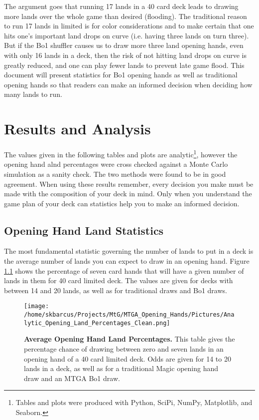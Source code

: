 \documentclass[oneside]{book}   %
\begin{document}
The argument goes that running 17 lands in a 40 card deck leads to drawing more lands over the whole game than desired (flooding). The traditional reason to run 17 lands in limited is for color considerations and to make certain that one hits one's important land drops on curve (i.e. having three lands on turn three). But if the Bo1 shuffler causes us to draw more three land opening hands, even with only 16 lands in a deck, then the risk of not hitting land drops on curve is greatly reduced, and one can play fewer lands to prevent late game flood. This document will present statistics for Bo1 opening hands as well as traditional opening hands so that readers can make an informed decision when deciding how many lands to run.

\chapter{Results and Analysis}
\label{results}

The values given in the following tables and plots are analytic\footnote{Tables and plots were produced with Python, SciPi, NumPy, Matplotlib, and Seaborn.}, however the opening hand alnd percentages were cross checked against a Monte Carlo simulation as a sanity check. The two methods were found to be in good agreement. When using these results remember, every decision you make must be made with the composition of your deck in mind. Only when you understand the game plan of your deck can statistics help you to make an informed decision.

\section{Opening Hand Land Statistics}
\label{opener}

The most fundamental statistic governing the number of lands to put in a deck is the average number of lands you can expect to draw in an opening hand. Figure \ref{fig:opening_hand_percentages} shows the percentage of seven card hands that will have a given number of lands in them for 40 card limited deck. The values are given for decks with between 14 and 20 lands, as well as for traditional draws and Bo1 draws.  

	\begin{figure}[!ht]
	\centering
	\centerline{\texttt{[image: /home/skbarcus/Projects/MtG/MTGA\_Opening\_Hands/Pictures/Analytic\_Opening\_Land\_Percentages\_Clean.png]}}
	\caption{
	{\bf{Average Opening Hand Land Percentages.}} This table gives the percentage chance of drawing between zero and seven lands in an opening hand of a 40 card limited deck. Odds are given for 14 to 20 lands in a deck, as well as for a traditional Magic opening hand draw and an MTGA Bo1 draw.}
	\label{fig:opening_hand_percentages}
	\end{figure}	
	
\end{document}
